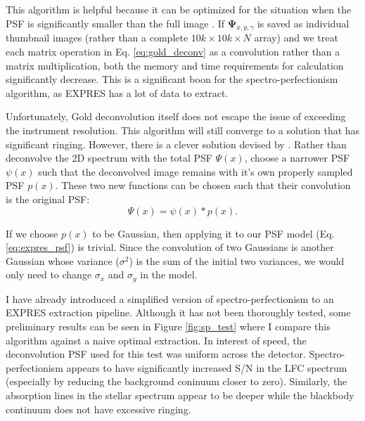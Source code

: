 \documentclass[11pt]{article}
\begin{document}
This algorithm is helpful because it can be optimized for the situation when the PSF is significantly smaller than the full image \citep{Morhac2003}. If $\mathbf{\Psi}_{x,y,\gamma}$ is saved as individual thumbnail images (rather than a complete $10k \times 10k \times N$ array) and we treat each matrix operation in Eq. \ref{eq:gold_deconv} as a convolution rather than a matrix multiplication, both the memory and time requirements for calculation significantly decrease. This is a significant boon for the spectro-perfectionism algorithm, as EXPRES has a lot of data to extract.

Unfortunately, Gold deconvolution itself does not escape the issue of exceeding the instrument resolution. This algorithm will still converge to a solution that has significant ringing. However, there is a clever solution devised by \citet{Magain1998}. Rather than deconvolve the 2D spectrum with the total PSF $\Psi(x)$, choose a narrower PSF $\psi(x)$ such that the deconvolved image remains with it's own properly sampled PSF $p(x)$. These two new functions can be chosen such that their convolution is the original PSF:
\begin{equation}
    \Psi(x) = \psi(x) * p(x).
\end{equation}

If we choose $p(x)$ to be Gaussian, then applying it to our PSF model (Eq. \ref{eq:expres_psf}) is trivial. Since the convolution of two Gaussians is another Gaussian whose variance ($\sigma^2$) is the sum of the initial two variances, we would only need to change $\sigma_x$ and $\sigma_y$ in the model.

I have already introduced a simplified version of spectro-perfectionism to an EXPRES extraction pipeline. Although it has not been thoroughly tested, some preliminary results can be seen in Figure \ref{fig:sp_test} where I compare this algorithm against a naive optimal extraction. In interest of speed, the deconvolution PSF used for this test was uniform across the detector. Spectro-perfectionism appears to have significantly increased S/N in the LFC spectrum (especially by reducing the background coninuum closer to zero). Similarly, the absorption lines in the stellar spectrum appear to be deeper while the blackbody continuum does not have excessive ringing.
\end{document}
